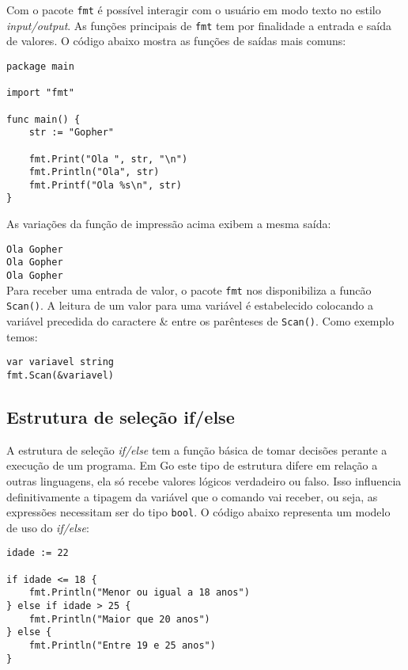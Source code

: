 \documentclass{SBCbookchapter}
\begin{document}
Com o pacote \texttt{fmt} é possível interagir com o usuário em modo texto no estilo \textit{input/output}. As funções principais de \texttt{fmt} tem por finalidade a entrada e saída de valores. O código abaixo mostra as funções de saídas mais comuns:

\begin{lstlisting}
package main

import "fmt"

func main() {
	str := "Gopher"
	
	fmt.Print("Ola ", str, "\n")
	fmt.Println("Ola", str)
	fmt.Printf("Ola %s\n", str)
}
\end{lstlisting}

As variações da função de impressão acima exibem a mesma saída:

\noindent\texttt{Ola Gopher}\\
\texttt{Ola Gopher}\\
\texttt{Ola Gopher}\\

Para receber uma entrada de valor, o pacote \texttt{fmt} nos disponibiliza a funcão \texttt{Scan()}. A leitura de um valor para uma variável é estabelecido colocando a variável precedida do caractere \& entre os parênteses de \texttt{Scan()}. Como exemplo temos:

\begin{lstlisting}
var variavel string
fmt.Scan(&variavel)
\end{lstlisting}


\subsection{Estrutura de seleção if/else}

A estrutura de seleção \textit{if/else} tem a função básica de tomar decisões perante a execução de um programa. Em Go este tipo de estrutura difere em relação a outras linguagens, ela só recebe valores lógicos verdadeiro ou falso. Isso influencia definitivamente a tipagem da variável que o comando vai receber, ou seja, as expressões necessitam ser do tipo \texttt{bool}. O código abaixo representa um modelo de uso do \textit{if/else}:

\begin{lstlisting}
idade := 22

if idade <= 18 {
	fmt.Println("Menor ou igual a 18 anos")
} else if idade > 25 {
	fmt.Println("Maior que 20 anos")
} else {
	fmt.Println("Entre 19 e 25 anos")
}
\end{lstlisting}
\end{document}
